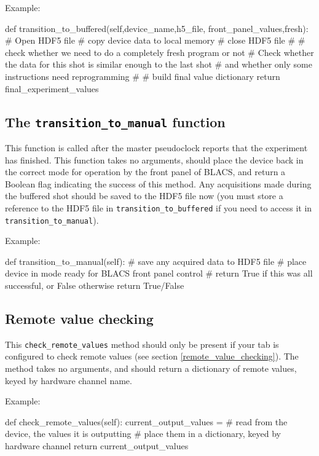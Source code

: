 \documentclass[12pt]{article}
\begin{document}
Example:
\begin{python}
    def transition_to_buffered(self,device_name,h5_file,
                               front_panel_values,fresh):
        # Open HDF5 file
        # copy device data to local memory
        # close HDF5 file
        #
        # check whether we need to do a completely fresh program or not
        # Check whether the data for this shot is similar enough to the last shot
        #       and whether only some instructions need reprogramming
        # 
        # build final value dictionary
        return final_experiment_values
\end{python}

\subsection{The \texttt{transition\_to\_manual} function}
This function is called after the master pseudoclock reports that the experiment has finished. 
This function takes no arguments, should place the device back in the correct mode for operation by the front panel of BLACS, and return a Boolean flag indicating the success of this method.
Any acquisitions made during the buffered shot should be saved to the HDF5 file now (you must store a reference to the HDF5 file in \texttt{transition\_to\_buffered} if you need to access it in \texttt{transition\_to\_manual}).

Example:
\begin{python}
    def transition_to_manual(self):
        # save any acquired data to HDF5 file
        # place device in mode ready for BLACS front panel control
        # return True if this was all successful, or False otherwise
        return True/False
\end{python}

\subsection{Remote value checking}\label{worker:remote_value_checking}
This \texttt{check\_remote\_values} method should only be present if your tab is configured to check remote values (see section \ref{remote_value_checking}).
The method takes no arguments, and should return a dictionary of remote values, keyed by hardware channel name.

Example:
\begin{python}
    def check_remote_values(self):
        current_output_values = {}
        # read from the device, the values it is outputting
        # place them in a dictionary, keyed by hardware channel
        return current_output_values
\end{python}
\end{document}
